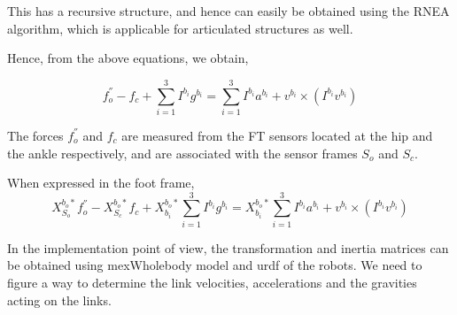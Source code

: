 \documentclass[letterpaper, 10pt, conference]{ieeeconf}      %
\begin{document}
This has a recursive structure, and hence can easily be obtained using the RNEA algorithm, which is applicable for articulated structures as well.

Hence, from the above equations, we obtain, 

$$ f_{o}^{''} - f_{c} + \sum_{i=1}^{3} I^{b_{i}}g^{b_{i}} = \sum_{i=1}^{3} I^{b_{i}}a^{b_{i}} + v^{b_{i}}\times (I^{b_{i}}v^{b_{i}})$$

The forces $f_{o}^{''}$ and $f_{c}$ are measured from the FT sensors located at the hip and the ankle respectively, and are associated with the sensor frames $S_{o}$ and $S_{c}$.

When expressed in the foot frame,
$$ X^{b_{o}*}_{S_{o}} f_{o}^{''} - X^{b_{o}*}_{S_{c}} f_{c} + X^{b_{o}*}_{b_{i}} \sum_{i=1}^{3} I^{b_{i}}g^{b_{i}} = X^{b_{o}*}_{b_{i}} \sum_{i=1}^{3} I^{b_{i}}a^{b_{i}} + v^{b_{i}}\times (I^{b_{i}}v^{b_{i}})$$


In the implementation point of view, the transformation and inertia matrices can be obtained using mexWholebody model and urdf of the robots. We need to figure a way to determine the link velocities, accelerations and the gravities acting on the links.

\addtolength{\textheight}{-12cm}   %













\end{document}
